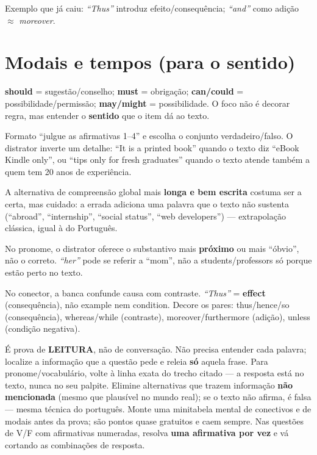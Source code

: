 Exemplo que já caiu: \textit{``Thus''} introduz efeito/consequência;
\textit{``and''} como adição $\approx$ \textit{moreover}.

\section{Modais e tempos (para o sentido)}

\textbf{should} = sugestão/conselho; \textbf{must} = obrigação;
\textbf{can/could} = possibilidade/permissão; \textbf{may/might} =
possibilidade. O foco não é decorar regra, mas entender o \textbf{sentido}
que o item dá ao texto.

\begin{pegadinha}
Formato ``julgue as afirmativas 1--4'' e escolha o conjunto verdadeiro/falso.
O distrator inverte um detalhe: ``It is a printed book'' quando o texto diz
``eBook Kindle only'', ou ``tips only for fresh graduates'' quando o texto
atende também a quem tem 20 anos de experiência.

A alternativa de compreensão global mais \textbf{longa e bem escrita}
costuma ser a certa, mas cuidado: a errada adiciona uma palavra que o texto
não sustenta (``abroad'', ``internship'', ``social status'', ``web
developers'') --- extrapolação clássica, igual à do Português.

No pronome, o distrator oferece o substantivo mais \textbf{próximo} ou mais
``óbvio'', não o correto. \textit{``her''} pode se referir a ``mom'', não a
students/professors só porque estão perto no texto.

No conector, a banca confunde causa com contraste. \textit{``Thus''} =
\textbf{effect} (consequência), não example nem condition. Decore os pares:
thus/hence/so (consequência), whereas/while (contraste),
moreover/furthermore (adição), unless (condição negativa).
\end{pegadinha}

\begin{comosair}
É prova de \textbf{LEITURA}, não de conversação. Não precisa entender cada
palavra; localize a informação que a questão pede e releia \textbf{só}
aquela frase. Para pronome/vocabulário, volte à linha exata do trecho
citado --- a resposta está no texto, nunca no seu palpite. Elimine
alternativas que trazem informação \textbf{não mencionada} (mesmo que
plausível no mundo real); se o texto não afirma, é falsa --- mesma técnica do
português. Monte uma minitabela mental de conectivos e de modais antes da
prova; são pontos quase gratuitos e caem sempre. Nas questões de V/F com
afirmativas numeradas, resolva \textbf{uma afirmativa por vez} e vá cortando
as combinações de resposta.
\end{comosair}

